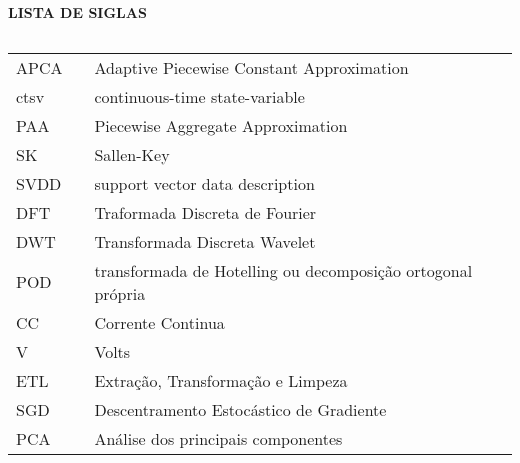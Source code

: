\newpage

\begin{center}
\textbf{LISTA DE SIGLAS}
\end{center}
$\!$\\

\begin{tabular}{lll}


APCA & \hspace{1cm} &  Adaptive Piecewise Constant Approximation \\
ctsv  & \hspace{1cm} & continuous-time state-variable \\
PAA  & \hspace{1cm} &  Piecewise Aggregate Approximation \\
SK  & \hspace{1cm} &  Sallen-Key \\
SVDD  & \hspace{1cm} & support vector data description \\
DFT & \hspace{1cm} & Traformada Discreta de Fourier\\
DWT & \hspace{1cm} &Transformada Discreta Wavelet \\
POD & \hspace{1cm} & transformada de Hotelling ou decomposição ortogonal própria \\
CC & \hspace{1cm} & Corrente Continua\\
V & \hspace{1cm} & Volts\\
ETL & \hspace{1cm} & Extração, Transformação e Limpeza\\
SGD & \hspace{1cm} & Descentramento Estocástico de Gradiente\\
PCA & \hspace{1cm} & Análise dos principais componentes\\
\end{tabular}
